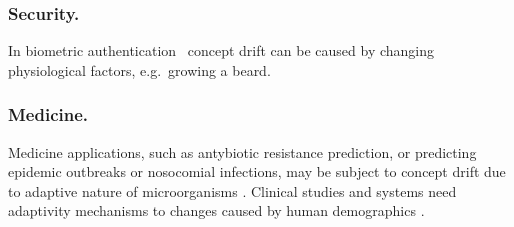 \documentclass{llncs}
\begin{document}
\subsubsection{Security.}

In biometric authentication~\cite{Yampolskiy07,Poh09} concept drift can be caused by changing physiological factors, e.g.\ growing a beard.

\subsubsection{Medicine.}

Medicine applications, such as antybiotic resistance prediction, or predicting epidemic outbreaks or nosocomial infections, may be subject to concept drift due to adaptive nature of microorganisms \cite{Tsymbal08,Jermaine08,Martin12}.
Clinical studies and systems need adaptivity mechanisms to changes caused by human demographics \cite{Kukar03,Gago07}.
\end{document}
